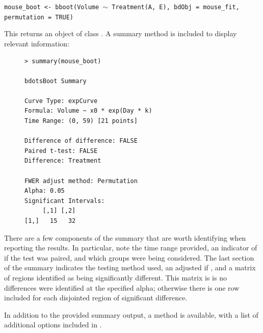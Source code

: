 \begin{center}
\tt mouse\_boot <- bboot(Volume $\sim$ Treatment(A, E), bdObj = mouse\_fit, permutation = TRUE)
\end{center}


This returns an object of class . A summary method is included to display relevant information:

\begin{singlespace}
\begin{figure}[H]
\centering
\begin{BVerbatim}
> summary(mouse_boot)

bdotsBoot Summary

Curve Type: expCurve 
Formula: Volume ~ x0 * exp(Day * k) 
Time Range: (0, 59) [21 points]

Difference of difference: FALSE 
Paired t-test: FALSE 
Difference: Treatment 

FWER adjust method: Permutation 
Alpha: 0.05 
Significant Intervals:
     [,1] [,2]
[1,]   15   32
\end{BVerbatim}
\end{figure}
\end{singlespace}

There are a few components of the summary that are worth identifying when reporting the results. In particular, note the time range provided, an indicator of if the test was paired, and which groups were being considered. The last section of the summary indicates the testing method used, an adjusted  if , and a matrix of regions identified as being significantly different. This matrix is  is no differences were identified at the specified alpha; otherwise there is one row included for each disjointed region of significant difference.

In addition to the provided summary output, a  method is available, with a list of additional options included in .

